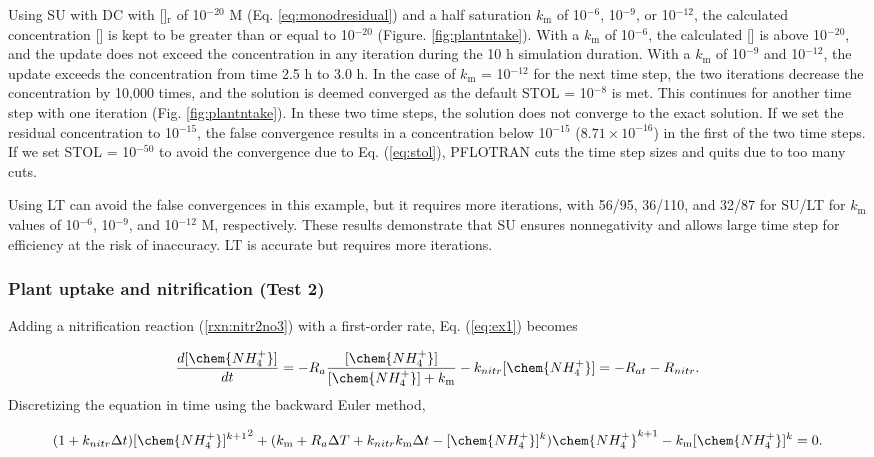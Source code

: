 \documentclass[gmd, manuscript]{copernicus}
\begin{document}
Using SU with DC with []$_\text{r}$ of 10$^{-20}$ \unit{M} (Eq.
\ref{eq:monodresidual}) and a half saturation $k_\text{m}$ of 10$^{-6}$,
10$^{-9}$, or 10$^{-12}$, the calculated concentration [] is kept
to be greater than or equal to 10$^{-20}$ (Figure. \ref{fig:plantntake}). With
a $k_\text{m}$ of 10$^{-6}$, the calculated [] is above 10$^{-20}$,
and the update does not exceed the concentration in any iteration during the 10
\unit{h} simulation duration. With a $k_\text{m}$ of 10$^{-9}$ and 10$^{-12}$,
the update exceeds the concentration from time 2.5 h to 3.0 \unit{h}. In the
case of $k_\text{m}$ = 10$^{-12}$  for the next time step, the two
iterations decrease the concentration by 10,000 times, and the solution is
deemed converged as the default STOL = 10$^{-8}$ is met.  This continues for
another time step with one iteration (Fig. \ref{fig:plantntake}). In these two
time steps, the solution does not converge to the exact solution. If we set the
residual concentration to 10$^{-15}$, the false convergence results in a
concentration below 10$^{-15}$ ($8.71\times10^{-16}$) in the first of the two
time steps. If we set STOL = 10$^{-50}$ to avoid the convergence due to Eq.
(\ref{eq:stol}), PFLOTRAN cuts the time step sizes and quits due to too many cuts.

Using LT can avoid the false convergences in this example, but it requires more
iterations, with 56/95, 36/110, and 32/87 for SU/LT for $k_\text{m}$ values of
10$^{-6}$, 10$^{-9}$, and 10$^{-12}$ M, respectively. These results demonstrate
that SU ensures nonnegativity and allows large time step for efficiency at the
risk of inaccuracy. LT is accurate but requires more iterations. 

\subsubsection{Plant  uptake and nitrification (Test 2)}

Adding a nitrification reaction (\ref{rxn:nitr2no3}) with a first-order rate,
Eq. (\ref{eq:ex1}) becomes

\begin{equation}
\frac{d[\chem{NH_4^+}]}{dt} =- R_a
\frac{[\chem{NH_4^+}]}{[\chem{NH_4^+}]+k_\text{m}}
- k_{nitr} [\chem{NH_4^+}] = -R_{at} - R_{nitr}.
\label{eq:ex2}
\end{equation}
Discretizing the equation in time using the backward Euler method, 

\begin{equation}
(1 + k_{nitr} \Delta t){[\chem{NH_4^+}]^{k+1}}^2+(k_\text{m}+R_a\Delta T +
k_{nitr} k_\text{m} \Delta t - [\chem{NH_4^+}]^k ) \chem{NH_4^+}^{k+1} -
k_\text{m} [\chem{NH_4^+}]^k = 0.
\end{equation}
\end{document}
